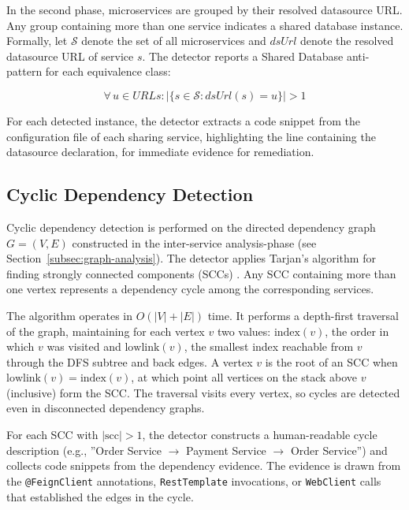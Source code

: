 In the second phase, microservices are grouped by their resolved datasource URL. Any group containing more than one service indicates a shared database instance. Formally, let $\mathcal{S}$ denote the set of all microservices and $\mathit{dsUrl}$ denote the resolved datasource URL of service $s$. The detector reports a Shared Database anti-pattern for each equivalence class:

\begin{equation}
    \forall\, u \in \mathit{URLs} : \bigl|\{s \in \mathcal{S} : \mathit{dsUrl}(s) = u\}\bigr| > 1
    \label{eq:shared-db-detection}
\end{equation}

For each detected instance, the detector extracts a code snippet from the configuration file of each sharing service, highlighting the line containing the datasource declaration, for immediate evidence for remediation.

\subsection{Cyclic Dependency Detection}
\label{subsec:detect-cyclic-dependency}

\par Cyclic dependency detection is performed on the directed dependency graph $G = (V, E)$ constructed in the inter-service analysis-phase (see Section~\ref{subsec:graph-analysis}). The detector applies Tarjan's algorithm for finding strongly connected components (SCCs) \cite{Tarjan1972}. Any SCC containing more than one vertex represents a dependency cycle among the corresponding services.

The algorithm operates in $O(|V| + |E|)$ time. It performs a depth-first traversal of the graph, maintaining for each vertex $v$ two values: $\text{index}(v)$, the order in which $v$ was visited and $\text{lowlink}(v)$, the smallest index reachable from $v$ through the DFS subtree and back edges. A vertex $v$ is the root of an SCC when $\text{lowlink}(v) = \text{index}(v)$, at which point all vertices on the stack above $v$ (inclusive) form the SCC. The traversal visits every vertex, so cycles are detected even in disconnected dependency graphs.

For each SCC with $|\text{scc}| > 1$, the detector constructs a human-readable cycle description (e.g., ''Order Service $\to$ Payment Service $\to$ Order Service'') and collects code snippets from the dependency evidence. The evidence is drawn from the \texttt{@FeignClient} annotations, \texttt{RestTemplate} invocations, or \texttt{WebClient} calls that established the edges in the cycle.

